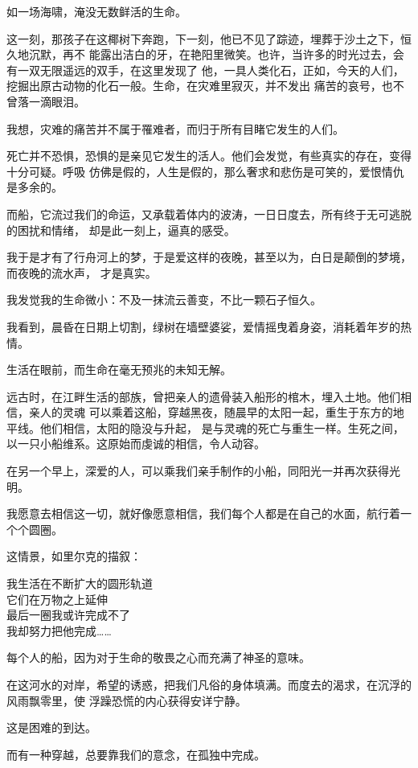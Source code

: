 		如一场海啸，淹没无数鲜活的生命。

		这一刻，那孩子在这椰树下奔跑，下一刻，他已不见了踪迹，埋葬于沙土之下，恒久地沉默，再不
	能露出洁白的牙，在艳阳里微笑。也许，当许多的时光过去，会有一双无限遥远的双手，在这里发现了
	他，一具人类化石，正如，今天的人们，挖掘出原古动物的化石一般。生命，在灾难里寂灭，并不发出
	痛苦的哀号，也不曾落一滴眼泪。

		我想，灾难的痛苦并不属于罹难者，而归于所有目睹它发生的人们。


		死亡并不恐惧，恐惧的是亲见它发生的活人。他们会发觉，有些真实的存在，变得十分可疑。呼吸
	仿佛是假的，人生是假的，那么奢求和悲伤是可笑的，爱恨情仇是多余的。

		而船，它流过我们的命运，又承载着体内的波涛，一日日度去，所有终于无可逃脱的困扰和情绪，
	却是此一刻上，逼真的感受。

		我于是才有了行舟河上的梦，于是爱这样的夜晚，甚至以为，白日是颠倒的梦境，而夜晚的流水声，
	才是真实。

		我发觉我的生命微小：不及一抹流云善变，不比一颗石子恒久。

		我看到，晨昏在日期上切割，绿树在墙壁婆娑，爱情摇曳着身姿，消耗着年岁的热情。


		生活在眼前，而生命在毫无预兆的未知无解。


		远古时，在江畔生活的部族，曾把亲人的遗骨装入船形的棺木，埋入土地。他们相信，亲人的灵魂
	可以乘着这船，穿越黑夜，随晨早的太阳一起，重生于东方的地平线。他们相信，太阳的隐没与升起，
	是与灵魂的死亡与重生一样。生死之间，以一只小船维系。这原始而虔诚的相信，令人动容。


		在另一个早上，深爱的人，可以乘我们亲手制作的小船，同阳光一并再次获得光明。

		我愿意去相信这一切，就好像愿意相信，我们每个人都是在自己的水面，航行着一个个圆圈。


		这情景，如里尔克的描叙：

		\longpoem{}{}{}
			我生活在不断扩大的圆形轨道 \\
			它们在万物之上延伸 \\
			最后一圈我或许完成不了 \\
			我却努力把他完成……
		\endlongpoem


		每个人的船，因为对于生命的敬畏之心而充满了神圣的意味。

		在这河水的对岸，希望的诱惑，把我们凡俗的身体填满。而度去的渴求，在沉浮的风雨飘零里，使
	浮躁恐慌的内心获得安详宁静。

		这是困难的到达。


		而有一种穿越，总要靠我们的意念，在孤独中完成。

